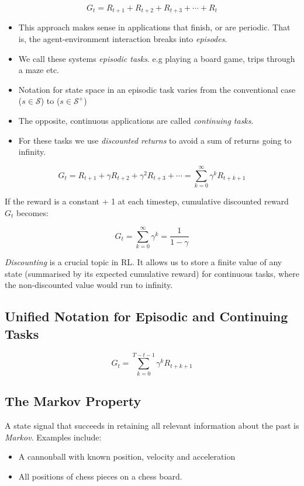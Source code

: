 \begin{equation}
	G_t = R_{t+1} + R_{t+2} + R_{t+3} + \cdots + R_t
\end{equation}

\begin{itemize}
	\item This approach makes sense in applications that finish, or are periodic. That is, the agent-environment interaction breaks into \textit{episodes}.
	\item We call these systems \textit{episodic tasks}. e.g playing a board game, trips through a maze etc.
	\item Notation for state space in an episodic task varies from the conventional case (\(s \in \mathcal{S}\)) to (\(s \in \mathcal{S^+}\))
	\item The opposite, continuous applications are called \textit{continuing tasks}.
	\item For these tasks we use \textit{discounted returns} to avoid a sum of returns going to infinity.
\end{itemize}

\begin{equation}
	G_t = R_{t+1} + \gamma R_{t+2} + \gamma^2 R_{t+3} + \cdots = \sum_{k=0}^{\infty} \gamma^k R_{t+k+1} 
\end{equation}

If the reward is a constant + 1 at each timestep, cumulative discounted reward $G_t$ becomes:

\begin{equation}
G_t = \sum_{k=0}^{\infty} \gamma^k = \frac{1}{1 - \gamma}
\end{equation}

\textit{Discounting} is a crucial topic in RL. It allows us to store a finite value of any state (summarised by its expected cumulative reward) for continuous tasks, where the non-discounted value would run to infinity. 

\subsection{Unified Notation for Episodic and Continuing Tasks}
\begin{equation}
	G_t = \sum_{k=0}^{T-t-1} \gamma^k R_{t+k+1} 
\end{equation}

\subsection{The Markov Property}
A state signal that succeeds in retaining all relevant information about the past is \textit{Markov}. Examples include:
\begin{itemize}
\item A cannonball with known position, velocity and acceleration
\item All positions of chess pieces on a chess board.
\end{itemize}

